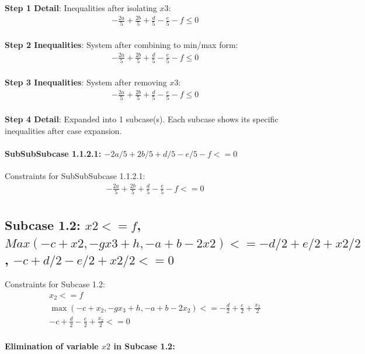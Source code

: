 \documentclass{article}
\begin{document}
\textbf{Step 1 Detail}: Inequalities after isolating $x3$:
\begin{align}
& - \frac{2 a}{5} + \frac{2 b}{5} + \frac{d}{5} - \frac{e}{5} - f \leq 0 \\
\end{align}

\textbf{Step 2 Inequalities}: System after combining to min/max form:
\begin{align}
& - \frac{2 a}{5} + \frac{2 b}{5} + \frac{d}{5} - \frac{e}{5} - f \leq 0 \\
\end{align}

\textbf{Step 3 Inequalities}: System after removing $x3$:
\begin{align}
& - \frac{2 a}{5} + \frac{2 b}{5} + \frac{d}{5} - \frac{e}{5} - f \leq 0 \\
\end{align}

\textbf{Step 4 Detail}: Expanded into 1 subcase(s).
Each subcase shows its specific inequalities after case expansion.

\paragraph{SubSubSubcase 1.1.2.1: $-2 a/5 + 2 b/5 + d/5 - e/5 - f <= 0$}

Constraints for SubSubSubcase 1.1.2.1:
\begin{align}
& - \frac{2 a}{5} + \frac{2 b}{5} + \frac{d}{5} - \frac{e}{5} - f <= 0 \\
\end{align}

\subsection{Subcase 1.2: $x2 <= f$, $Max(-c + x2, -g x3 + h, -a + b - 2 x2) <= -d/2 + e/2 + x2/2$, $-c + d/2 - e/2 + x2/2 <= 0$}

Constraints for Subcase 1.2:
\begin{align}
& x_{2} <= f \\
& \max\left(- c + x_{2}, - g x_{3} + h, - a + b - 2 x_{2}\right) <= - \frac{d}{2} + \frac{e}{2} + \frac{x_{2}}{2} \\
& - c + \frac{d}{2} - \frac{e}{2} + \frac{x_{2}}{2} <= 0 \\
\end{align}

\textbf{Elimination of variable $x2$ in Subcase 1.2:}
\end{document}
